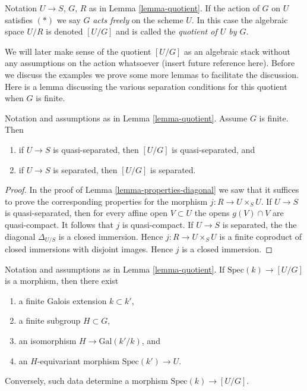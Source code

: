 \begin{definition}
\label{definition-quotient}
Notation $U \to S$, $G$, $R$ as in Lemma \ref{lemma-quotient}.
If the action of $G$ on $U$ satisfies $(*)$ we say $G$ {\it acts freely}
on the scheme $U$. In this case the algebraic space $U/R$ is denoted
$[U/G]$ and is called the {\it quotient of $U$ by $G$}.
\end{definition}

\noindent
We will later make sense of the quotient $[U/G]$ as an
algebraic stack without any assumptions on the action whatsoever
(insert future reference here). Before we discuss the examples we prove
some more lemmas to facilitate the discussion. Here is a lemma discussing the
various separation conditions for this quotient when $G$ is finite.

\begin{lemma}
\label{lemma-quotient-finite-separated}
Notation and assumptions as in Lemma \ref{lemma-quotient}.
Assume $G$ is finite. Then
\begin{enumerate}
\item if $U \to S$ is quasi-separated, then $[U/G]$ is quasi-separated, and
\item if $U \to S$ is separated, then $[U/G]$ is separated.
\end{enumerate}
\end{lemma}

\begin{proof}
In the proof of Lemma \ref{lemma-properties-diagonal}
we saw that it suffices to prove the
corresponding properties for the morphism $j : R \to U \times_S U$.
If $U \to S$ is quasi-separated, then for every affine open $V \subset U$
the opens $g(V) \cap V$ are quasi-compact. It follows that $j$ is
quasi-compact.
If $U \to S$ is separated, the the diagonal $\Delta_{U/S}$ is a closed
immersion. Hence $j : R \to U \times_S U$ is a finite coproduct
of closed immersions with disjoint images. Hence $j$ is a closed immersion.
\end{proof}

\begin{lemma}
\label{lemma-quotient-field-map}
Notation and assumptions as in Lemma \ref{lemma-quotient}.
If $\text{Spec}(k) \to [U/G]$ is a morphism, then there exist
\begin{enumerate}
\item a finite Galois extension $k \subset k'$,
\item a finite subgroup $H \subset G$,
\item an isomorphism $H \to \text{Gal}(k'/k)$, and
\item an $H$-equivariant morphism $\text{Spec}(k') \to U$.
\end{enumerate}
Conversely, such data determine a morphism $\text{Spec}(k) \to [U/G]$.
\end{lemma}

